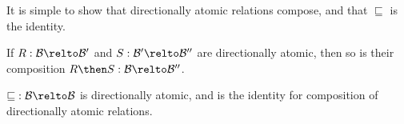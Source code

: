 It is simple to show that directionally atomic relations compose, and that
$\sqsubseteq$ is the identity.
\begin{proposition}
  If \(R : \mathcal{B} \relto \mathcal{B}'\) and
  \(S : \mathcal{B}' \relto \mathcal{B}''\) are directionally atomic, then so is
  their composition \(R \then S : \mathcal{B} \relto \mathcal{B}''\).
\end{proposition}
%
%

\begin{proposition}
  \(\mathbin{\sqsubseteq} : \mathcal{B} \relto \mathcal{B}\) is directionally
  atomic, and is the identity for composition of directionally atomic relations.
\end{proposition}


